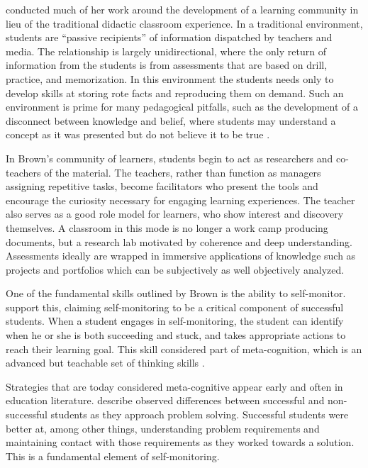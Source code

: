 \citet{brown-1992} conducted much of her work around the development of a learning community in lieu of the traditional didactic classroom experience. In a traditional environment, students are {}``passive recipients'' of information dispatched by teachers and media. The relationship is largely unidirectional, where the only return of information from the students is from assessments that are
based on drill, practice, and memorization. In this environment the
students needs only to develop skills at storing rote facts and reproducing
them on demand. Such an environment is prime for many pedagogical pitfalls,
such as the development of a disconnect between knowledge and belief,
where students may understand a concept as it was presented but do
not believe it to be true \citep{chinn-samar}. 

In Brown's community of learners, students begin to act as researchers
and co-teachers of the material. The teachers, rather than function
as managers assigning repetitive tasks, become facilitators who present
the tools and encourage the curiosity necessary for engaging learning
experiences. The teacher also serves as a good role model for learners,
who show interest and discovery themselves. A classroom in this mode
is no longer a work camp producing documents, but a research lab motivated
by coherence and deep understanding. Assessments ideally are wrapped
in immersive applications of knowledge such as projects and portfolios
which can be subjectively as well objectively analyzed. 

One of the fundamental skills outlined by Brown is the ability to self-monitor. \citet{atman-1999} support this, claiming self-monitoring to be a critical component of successful students. When a student engages in self-monitoring, the student can identify when he or she is both succeeding and stuck, and takes appropriate actions to reach their learning goal. This skill considered part of meta-cognition, which is an advanced but teachable set of thinking skills \citep{beyer88}.

Strategies that are today considered meta-cognitive appear early and often in education literature. \citet{bloombroder50} describe observed differences between successful and non-successful students as they approach problem solving. Successful students were better at, among other things, understanding problem requirements and maintaining contact with those requirements as they worked towards a solution. This is a fundamental element of self-monitoring.

